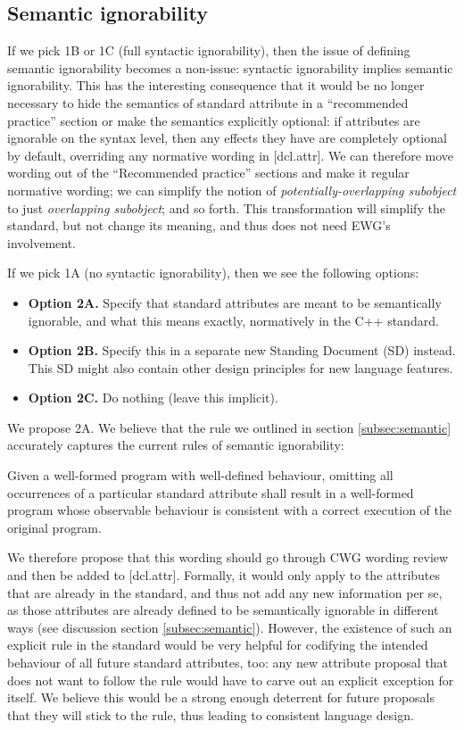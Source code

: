 \subsection{Semantic ignorability}

If we pick 1B or 1C (full syntactic ignorability), then the issue of defining semantic ignorability becomes a non-issue: syntactic ignorability implies semantic ignorability. This has the interesting consequence that it would be no longer necessary to hide the semantics of standard attribute in a ``recommended practice'' section or make the semantics explicitly optional: if attributes are ignorable on the syntax level, then any effects they have are completely optional by default, overriding any normative wording in [dcl.attr]. We can therefore move wording out of the ``Recommended practice'' sections and make it regular normative wording; we can simplify the notion of \emph{potentially-overlapping subobject} to just \emph{overlapping subobject}; and so forth. This transformation will simplify the standard, but not change its meaning, and thus does not need EWG's involvement.

If we pick 1A (no syntactic ignorability), then we see the following options:

\begin{itemize}
\item \textbf{Option 2A.} Specify that standard attributes are meant to be semantically ignorable, and what this means exactly, normatively in the C++ standard.
\item \textbf{Option 2B.} Specify this in a separate new Standing Document (SD) instead. This SD might also contain other design principles for new language features.
\item \textbf{Option 2C.} Do nothing (leave this implicit).
\end{itemize}

We propose 2A. We believe that the rule we outlined in section \ref{subsec:semantic} accurately captures the current rules of semantic ignorability:
\begin{adjustwidth}{0.5cm}{0.5cm}
Given a well-formed program with well-defined behaviour, omitting all occurrences of a particular standard attribute shall result in a well-formed program whose observable behaviour is consistent with a correct execution of the original program.
\end{adjustwidth}
We therefore propose that this wording should go through CWG wording review and then be added to [dcl.attr]. Formally, it would only apply to the attributes that are already in the standard, and thus not add any new information per se, as those attributes are already defined to be semantically ignorable in different ways (see discussion section \ref{subsec:semantic}). However, the existence of such an explicit rule in the standard would be very helpful for codifying the intended behaviour of all future standard attributes, too: any new attribute proposal that does not want to follow the rule would have to carve out an explicit exception for itself. We believe this would be a strong enough deterrent for future proposals that they will stick to the rule, thus leading to consistent language design.

